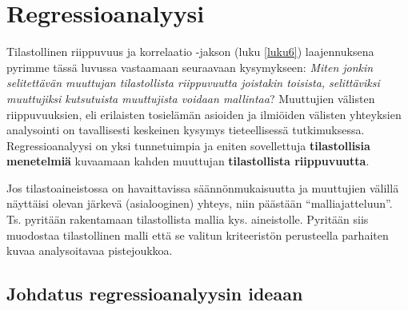 \documentclass[
]{book}
\begin{document}

\hypertarget{luku10}{%
\chapter{Regressioanalyysi}\label{luku10}}

Tilastollinen riippuvuus ja korrelaatio -jakson (luku \ref{luku6}) laajennuksena pyrimme tässä luvussa vastaamaan seuraavaan kysymykseen: \emph{Miten jonkin selitettävän muuttujan tilastollista riippuvuutta joistakin toisista, selittäviksi muuttujiksi kutsutuista muuttujista voidaan mallintaa}? Muuttujien välisten riippuvuuksien, eli erilaisten tosielämän asioiden ja ilmiöiden välisten yhteyksien analysointi on tavallisesti keskeinen kysymys tieteellisessä tutkimuksessa. Regressioanalyysi on yksi tunnetuimpia ja eniten sovellettuja \textbf{tilastollisia menetelmiä} kuvaamaan kahden muuttujan \textbf{tilastollista riippuvuutta}.

Jos tilastoaineistossa on havaittavissa säännönmukaisuutta ja muuttujien välillä näyttäisi olevan järkevä (asialooginen) yhteys, niin päästään ``malliajatteluun''. Ts. pyritään rakentamaan tilastollista mallia kys. aineistolle. Pyritään siis muodostaa tilastollinen malli että se valitun kriteeristön perusteella parhaiten kuvaa analysoitavaa pistejoukkoa.

\hypertarget{alaluku10}{%
\section{Johdatus regressioanalyysin ideaan}\label{alaluku10}}
\end{document}
